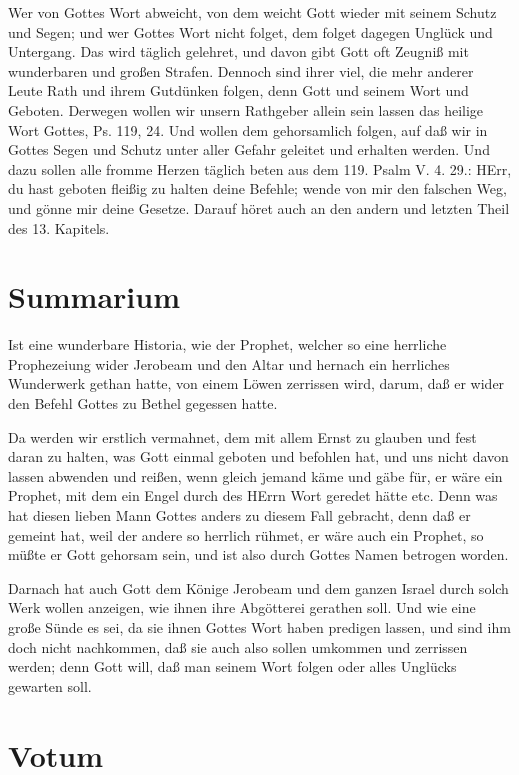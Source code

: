 Wer von Gottes Wort abweicht, von dem weicht Gott wieder mit seinem Schutz und Segen; und wer Gottes Wort nicht folget, dem folget dagegen Unglück und Untergang. Das wird täglich gelehret, und davon gibt Gott oft Zeugniß mit wunderbaren und großen Strafen. Dennoch sind ihrer viel, die mehr anderer Leute Rath und ihrem Gutdünken folgen, denn Gott und seinem Wort und Geboten. Derwegen wollen wir unsern Rathgeber allein sein lassen das heilige Wort Gottes, Ps. 119, 24. Und wollen dem gehorsamlich folgen, auf daß wir in Gottes Segen und Schutz unter aller Gefahr geleitet und erhalten werden. Und dazu sollen alle fromme Herzen täglich beten aus dem 119. Psalm V. 4. 29.: HErr, du hast geboten fleißig zu halten deine Befehle; wende von mir den falschen Weg, und gönne mir deine Gesetze. Darauf höret auch an den andern und letzten Theil des 13. Kapitels.

\section{Summarium}

Ist eine wunderbare Historia, wie der Prophet, welcher so eine herrliche Prophezeiung wider Jerobeam und den Altar und hernach ein herrliches Wunderwerk gethan hatte, von einem Löwen zerrissen wird, darum, daß er wider den Befehl Gottes zu Bethel gegessen hatte.

Da werden wir erstlich vermahnet, dem mit allem Ernst zu glauben und fest daran zu halten, was Gott einmal geboten und befohlen hat, und uns nicht davon lassen abwenden und reißen, wenn gleich jemand käme und gäbe für, er wäre ein Prophet, mit dem ein Engel durch des HErrn Wort geredet hätte etc. Denn was hat diesen lieben Mann Gottes anders zu diesem Fall gebracht, denn daß er gemeint hat, weil der andere so herrlich rühmet, er wäre auch ein Prophet, so müßte er Gott gehorsam sein, und ist also durch Gottes Namen betrogen worden.

Darnach hat auch Gott dem Könige Jerobeam und dem ganzen Israel durch solch Werk wollen anzeigen, wie ihnen ihre Abgötterei gerathen soll. Und wie eine große Sünde es sei, da sie ihnen Gottes Wort haben predigen lassen, und sind ihm doch nicht nachkommen, daß sie auch also sollen umkommen und zerrissen werden; denn Gott will, daß man seinem Wort folgen oder alles Unglücks gewarten soll.

\section{Votum}

